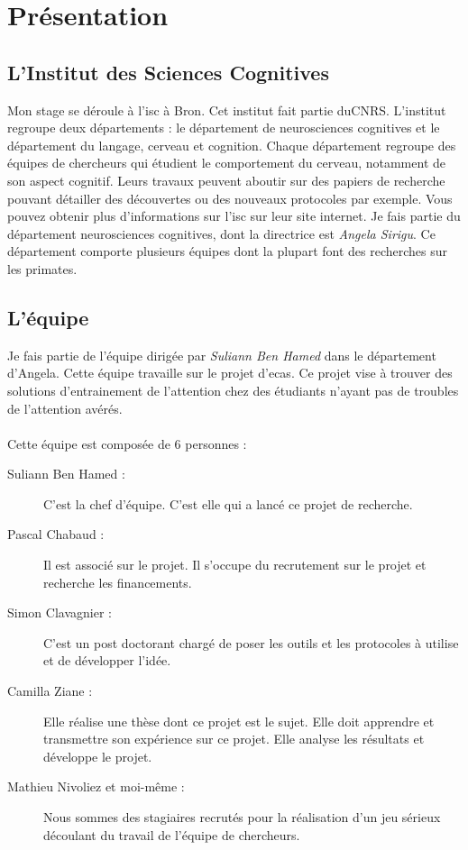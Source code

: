 \section{Présentation}

\subsection{L'Institut des Sciences Cognitives}

Mon stage se déroule à l'\gls{isc} à Bron. Cet institut fait partie du\gls{CNRS}. L'institut regroupe deux départements : le département de neurosciences cognitives et le département
du langage, cerveau et cognition. Chaque département regroupe des équipes de chercheurs qui étudient le comportement du cerveau, notamment de son aspect cognitif. Leurs travaux peuvent
aboutir sur des papiers de recherche pouvant détailler des découvertes ou des nouveaux protocoles par exemple. Vous pouvez obtenir plus d'informations sur l'\gls{isc} sur leur site
internet\cite{ISC00}. Je fais partie du département neurosciences cognitives, dont la directrice est \emph{Angela Sirigu}. Ce département comporte plusieurs équipes dont la plupart
font des recherches sur les primates.

\subsection{L'équipe}Je fais partie de l'équipe dirigée par \emph{Suliann Ben Hamed} dans le département d'Angela. Cette équipe travaille sur le projet d'\gls{ecas}. Ce projet vise à trouver
des solutions d'entrainement de l'attention chez des étudiants n'ayant pas de troubles de l'attention avérés.

\paragraph{}Cette équipe est composée de 6 personnes :
\begin{description}
    \item[Suliann Ben Hamed :] C'est la chef d'équipe. C'est elle qui a lancé ce projet de recherche.
    \item[Pascal Chabaud :] Il est associé sur le projet. Il s'occupe du recrutement sur le projet et recherche les financements.
    \item[Simon Clavagnier :] C'est un post doctorant chargé de poser les outils et les protocoles à utilise et de développer l'idée.
    \item[Camilla Ziane :] Elle réalise une thèse dont ce projet est le sujet. Elle doit apprendre et transmettre son expérience sur ce projet. Elle analyse les résultats et développe
    le projet.
    \item[Mathieu Nivoliez et moi-même :] Nous sommes des stagiaires recrutés pour la réalisation d'un jeu sérieux découlant du travail de l'équipe de chercheurs.\\ \\
\end{description}

